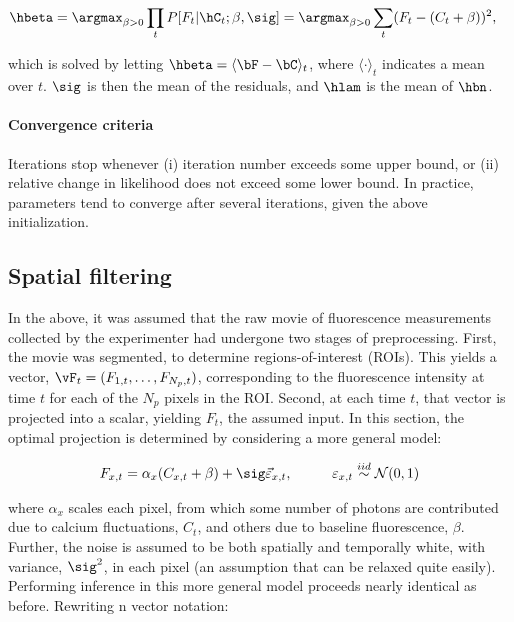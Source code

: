 \begin{align}
	\hbeta &= \argmax_{\beta >0} \prod_t P[F_t | \hC_t; \beta,\sig] = \argmax_{\beta>0} \sum_t (F_t - (C_t + \beta))^2,
\end{align}

\noindent which is solved by letting $\hbeta=\langle \bF-\bC \rangle_t$, where $\langle \cdot \rangle_t$ indicates a mean over $t$.  $\sig$ is then the mean of the residuals, and $\hlam$ is the mean of $\hbn$. 

\paragraph{Convergence criteria}

Iterations stop whenever (i) iteration number exceeds some upper bound, or (ii) relative change in likelihood does not exceed some lower bound.  In practice, parameters tend to converge after several iterations, given the above initialization. 


\subsection{Spatial filtering} \label{sec:spatial}

In the above, it was assumed that the raw movie of fluorescence measurements collected by the experimenter had undergone two stages of preprocessing.  First, the movie was segmented, to determine regions-of-interest (ROIs).  This yields a vector, $\vF_t=(F_{1,t}, \ldots, F_{N_p,t})$, corresponding to the fluorescence intensity at time $t$ for each of the $N_p$ pixels in the ROI.  Second, at each time $t$, that vector is projected into a scalar, yielding $F_t$, the assumed input.  In this section, the optimal projection is determined by considering a more general model:

\begin{align} \label{eq:bF}
F_{x,t} &= \alpha_x (C_{x,t} + \beta) +  \sig \vec{\varepsilon}_{x,t}, \qquad &\varepsilon_{x,t} \overset{iid}{\sim} \mathcal{N}(0,1)   
\end{align}

\noindent where $\alpha_x$ scales each pixel, from which some number of photons are contributed due to calcium fluctuations, $C_t$, and others due to baseline fluorescence, $\beta$.  Further, the noise is assumed to be both spatially and temporally white, with variance, $\sig^2$, in each pixel (an assumption that can be relaxed quite easily).  Performing inference in this more general model proceeds nearly identical as before. Rewriting n vector notation:

